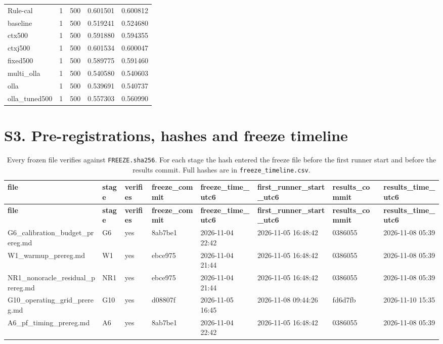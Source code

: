 \documentclass[10pt]{article}
\begin{document}
\begin{landscape}
\begin{longtable}{@{}lllll@{}}
Rule-cal & 1 & 500 & 0.601501 & 0.600812 \\
baseline & 1 & 500 & 0.519241 & 0.524680 \\
ctx500 & 1 & 500 & 0.591880 & 0.594355 \\
ctxj500 & 1 & 500 & 0.601534 & 0.600047 \\
fixed500 & 1 & 500 & 0.589775 & 0.591460 \\
multi\_olla & 1 & 500 & 0.540580 & 0.540603 \\
olla & 1 & 500 & 0.539691 & 0.540737 \\
olla\_tuned500 & 1 & 500 & 0.557303 & 0.560990 \\
\bottomrule
\end{longtable}
\normalsize
\section{S3. Pre-registrations, hashes and freeze timeline}
\scriptsize
\setlength{\tabcolsep}{3pt}
\begin{longtable}{@{}llllllll@{}}
\caption{Every frozen file verifies against \texttt{FREEZE.sha256}. For each stage the hash entered the freeze file before the first runner start and before the results commit. Full hashes are in \texttt{freeze\_timeline.csv}.}\\
\toprule
\textbf{file} & \textbf{stage} & \textbf{verifies} & \textbf{freeze\_commit} & \textbf{freeze\_time\_utc6} & \textbf{first\_runner\_start\_utc6} & \textbf{results\_commit} & \textbf{results\_time\_utc6} \\
\midrule
\endfirsthead
\toprule
\textbf{file} & \textbf{stage} & \textbf{verifies} & \textbf{freeze\_commit} & \textbf{freeze\_time\_utc6} & \textbf{first\_runner\_start\_utc6} & \textbf{results\_commit} & \textbf{results\_time\_utc6} \\
\midrule
\endhead
G6\_calibration\_budget\_prereg.md & G6 & yes & 8ab7be1 & 2026-11-04 22:42 & 2026-11-05 16:48:42 & 0386055 & 2026-11-08 05:39 \\
W1\_warmup\_prereg.md & W1 & yes & ebce975 & 2026-11-04 21:44 & 2026-11-05 16:48:42 & 0386055 & 2026-11-08 05:39 \\
NR1\_nonoracle\_residual\_prereg.md & NR1 & yes & ebce975 & 2026-11-04 21:44 & 2026-11-05 16:48:42 & 0386055 & 2026-11-08 05:39 \\
G10\_operating\_grid\_prereg.md & G10 & yes & d08807f & 2026-11-05 16:45 & 2026-11-08 09:44:26 & fd6d7fb & 2026-11-10 15:35 \\
A6\_pf\_timing\_prereg.md & A6 & yes & 8ab7be1 & 2026-11-04 22:42 & 2026-11-05 16:48:42 & 0386055 & 2026-11-08 05:39 \\

\end{longtable}
\end{landscape}
\end{document}
